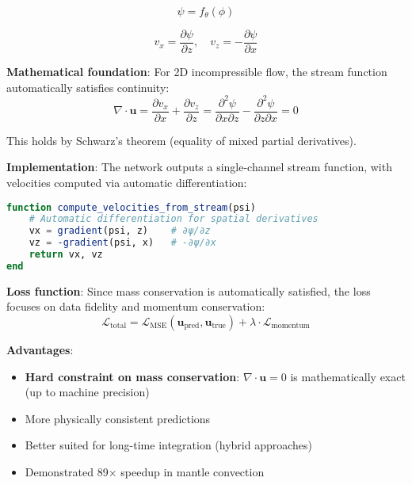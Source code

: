 \begin{equation}
\psi = f_{\theta}(\phi)
\end{equation}

\begin{equation}
v_x = \frac{\partial \psi}{\partial z}, \quad v_z = -\frac{\partial \psi}{\partial x}
\label{eq:stream_function}
\end{equation}

\textbf{Mathematical foundation}: For 2D incompressible flow, the stream function automatically satisfies continuity:
\begin{equation}
\nabla \cdot \mathbf{u} = \frac{\partial v_x}{\partial x} + \frac{\partial v_z}{\partial z} = \frac{\partial^2 \psi}{\partial x \partial z} - \frac{\partial^2 \psi}{\partial z \partial x} = 0
\end{equation}

This holds by Schwarz's theorem (equality of mixed partial derivatives).

\textbf{Implementation}: The network outputs a single-channel stream function, with velocities computed via automatic differentiation:

\begin{lstlisting}[language=Julia, caption={Stream function velocity computation}]
function compute_velocities_from_stream(psi)
    # Automatic differentiation for spatial derivatives
    vx = gradient(psi, z)    # ∂ψ/∂z
    vz = -gradient(psi, x)   # -∂ψ/∂x
    return vx, vz
end
\end{lstlisting}

\textbf{Loss function}: Since mass conservation is automatically satisfied, the loss focuses on data fidelity and momentum conservation:
\begin{equation}
\mathcal{L}_{\text{total}} = \mathcal{L}_{\text{MSE}}(\mathbf{u}_{\text{pred}}, \mathbf{u}_{\text{true}}) + \lambda \cdot \mathcal{L}_{\text{momentum}}
\end{equation}

\textbf{Advantages}:
\begin{itemize}
    \item \textbf{Hard constraint on mass conservation}: $\nabla \cdot \mathbf{u} = 0$ is mathematically exact (up to machine precision)
    \item More physically consistent predictions
    \item Better suited for long-time integration (hybrid approaches)
    \item Demonstrated 89$\times$ speedup in mantle convection \cite{agarwal2022}
\end{itemize}

